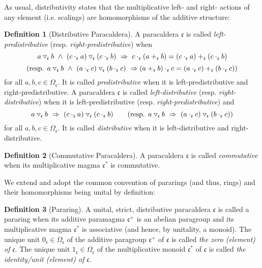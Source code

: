 \documentclass{article}
\theoremstyle{definition}
\newtheorem{definition}{Definition}[section]
\newcommand{\impl}{~\Rightarrow~}
\newcommand{\conj}{~\land~}
\newcommand{\tridown}{\mathbin{\hspace{.1em}\raisebox{.02em}{\rotatebox[origin=c]{90}{$\triangleleft$}}}}
\newcommand{\comp}{\tridown}
\begin{document}
As usual, distributivity states that the multiplicative left- and right- actions of any element (i.e. scalings) are homomorphisms of the additive structure:

\begin{definition}[Distributive Paracaldera]
A paracaldera \(\mathfrak{c}\) is called \textit{left-predistributive} (resp. \textit{right-predistributive}) when \[a\comp_\mathfrak{c}b\conj(c\cdot_\mathfrak{c}a)\comp_\mathfrak{c}(c\cdot_\mathfrak{c}b)\impl c\cdot_\mathfrak{c}(a+_\mathfrak{c}b)=(c\cdot_\mathfrak{c}a)+_\mathfrak{c}(c\cdot_\mathfrak{c}b)\]\[(\text{resp. }a\comp_\mathfrak{c}b\conj(a\cdot_\mathfrak{c}c)\comp_\mathfrak{c}(b\cdot_\mathfrak{c}c)\impl\\(a+_\mathfrak{c}b)\cdot_\mathfrak{c}c=(a\cdot_\mathfrak{c}c)+_\mathfrak{c}(b\cdot_\mathfrak{c}c))\] for all \(a,b,c\in\Omega_\mathfrak{c}\). It is called \textit{predistributive} when it is left-predistributive and right-predistributive. A paracaldera \(\mathfrak{c}\) is called \textit{left-distributive} (resp. \textit{right-distributive}) when it is left-predistributive (resp. \textit{right-predistributive}) and \[a\comp_\mathfrak{c}b\impl(c\cdot_\mathfrak{c}a)\comp_\mathfrak{c}(c\cdot_\mathfrak{c}b)\qquad(\text{resp. }a\comp_\mathfrak{c}b\impl(a\cdot_\mathfrak{c}c)\comp_\mathfrak{c}(b\cdot_\mathfrak{c}c))\] for all \(a,b,c\in\Omega_\mathfrak{c}\). It is called \textit{distributive} when it is left-distributive and right-distributive.
\end{definition}

\begin{definition}[Commutative Paracaldera]
A paracaldera \(\mathfrak{c}\) is called \textit{commutative} when its multiplicative magma \(\mathfrak{c}^\ast\) is commutative.
\end{definition}

We extend and adopt the common convention of pararings (and thus, rings) and their homomorphisms being unital by definition:

\begin{definition}[Pararing]
A unital, strict, distributive paracaldera \(\mathfrak{c}\) is called a pararing when its additive paramagma \(\mathfrak{c}^+\) is an abelian paragroup and its multiplicative magma \(\mathfrak{c}^\ast\) is associative (and hence, by unitality, a monoid). The unique unit \(0_\mathfrak{c}\in\Omega_\mathfrak{c}\) of the additive paragroup \(\mathfrak{c}^+\) of \(\mathfrak{c}\) is called \textit{the zero (element) of} \(\mathfrak{c}\). The unique unit \(1_\mathfrak{c}\in\Omega_\mathfrak{c}\) of the multiplicative monoid \(\mathfrak{c}^\ast\) of \(\mathfrak{c}\) is called \textit{the identity/unit (element) of} \(\mathfrak{c}\).
\end{definition}
\end{document}
